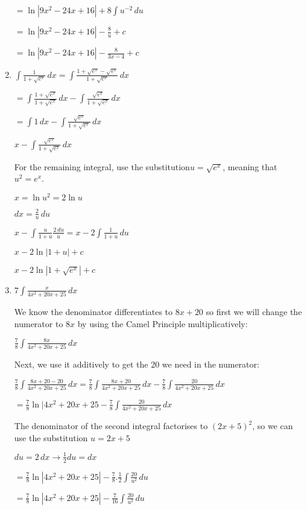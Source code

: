 \documentclass[../main.tex]{subfiles}
\begin{document}
\begin{enumerate}
    \(= \ln{|9x^2-24x+16|} + 8\int u^{-2}\,du\)

    \(= \ln{|9x^2-24x+16|} - \frac{8}{u} + c\)

    \(= \ln{|9x^2-24x+16|} - \frac{8}{3x-4} + c\)

    \item 
    \(\int \frac{1}{1+\sqrt{e^x}}\,dx=\int \frac{1+\sqrt{e^x}-\sqrt{e^x}}{1+\sqrt{e^x}}\,dx\)

    \(=\int \frac{1+\sqrt{e^x}}{1+\sqrt{e^x}}\,dx-\int \frac{\sqrt{e^x}}{1+\sqrt{e^x}}\,dx\)

    \(=\int 1\,dx-\int \frac{\sqrt{e^x}}{1+\sqrt{e^x}}\,dx\)

    \(x-\int \frac{\sqrt{e^x}}{1+\sqrt{e^x}}\,dx\)

    For the remaining integral, use the substitution\(u=\sqrt{e^x}\), meaning that \(u^2=e^x\).

    \(x=\ln{u^2}=2\ln{u}\)

    \(dx=\frac{2}{u}\,du\)

    \(x-\int \frac{u}{1+u}\frac{2\,du}{u}=x-2\int \frac{1}{1+u}\,du\)

    \(x-2\ln{|1+u|}+c\)

    \(x-2\ln{|1+\sqrt{e^x}|}+c\)
    
    \item
    \(7\int \frac{x}{4x^2+20x+25}\,dx\)

    We know the denominator differentiates to $8x+20$ so first we will change the numerator to $8x$ by using the Camel Principle multiplicatively:

    \(\frac{7}{8}\int \frac{8x}{4x^2+20x+25}\,dx\)

    Next, we use it additively to get the 20 we need in the numerator:

    \(\frac{7}{8}\int \frac{8x + 20 - 20}{4x^2+20x+25}\,dx= \frac{7}{8}\int \frac{8x + 20}{4x^2+20x+25}\,dx-\frac{7}{8}\int \frac{20}{4x^2+20x+25}\,dx\)

    \(=\frac{7}{8}\ln{|4x^2+20x+25} - \frac{7}{8}\int \frac{20}{4x^2+20x+25}\,dx\)

    The denominator of the second integral factorises to $(2x+5)^2$, so we can use the substitution $u=2x+5$

    $du = 2\,dx \rightarrow \frac{1}{2}du=dx$

    \(=\frac{7}{8}\ln{|4x^2+20x+25|} - \frac{7}{8}.\frac{1}{2}\int \frac{20}{u^2}\,du\)

    \(=\frac{7}{8}\ln{|4x^2+20x+25|} - \frac{7}{16}\int \frac{20}{u^2}\,du\)


\end{enumerate}
\end{document}
